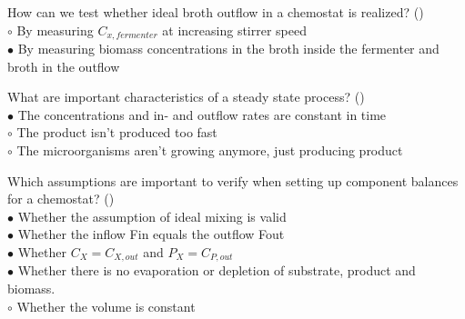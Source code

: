\documentclass[]{beamer}
\begin{document}
\begin{frame}[shrink] {}
\addtocounter{questions}{1}
\color{blue}
How can we test whether ideal broth outflow in a chemostat is realized? ()\\
\color{black}
\setlength{\parindent}{-0.4cm}
{\color{red}$\circ$}  By measuring $C_{x,fermenter}$ at increasing stirrer speed\\
{\color{red}$\bullet$} By measuring biomass concentrations in the broth inside the fermenter and broth in the outflow \\
\end{frame}

\begin{frame}[shrink] {}
\addtocounter{questions}{1}
\color{blue}
 What are important characteristics of a steady state process? ()\\
\color{black}
\setlength{\parindent}{-0.4cm}
{\color{red}$\bullet$}   The concentrations and in- and outflow rates are constant in time \\
{\color{red}$\circ$} The product isn’t produced too fast\\
{\color{red}$\circ$} The microorganisms aren’t growing anymore, just producing product \\
\end{frame}

\begin{frame}[shrink] {}
\addtocounter{questions}{1}
\color{blue}
Which assumptions are important to verify when setting up component balances for a chemostat? ()\\
\color{black}
\setlength{\parindent}{-0.4cm}
{\color{red}$\bullet$} Whether the assumption of ideal mixing is valid\\
{\color{red}$\bullet$} Whether the inflow Fin equals the outflow Fout\\
{\color{red}$\bullet$} Whether $C_X = C_{X,out}$ and $P_X = C_{P,out}$ \\
{\color{red}$\bullet$} Whether there is no evaporation or depletion of substrate, product and biomass.\\
{\color{red}$\circ$} Whether the volume is constant  \\
\end{frame}
\end{document}
